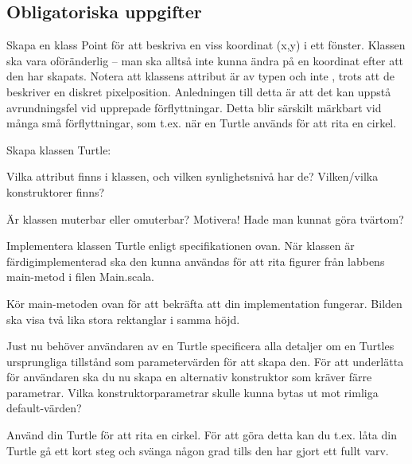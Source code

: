 \clearpage

\subsection{Obligatoriska uppgifter}

\Task Skapa en klass Point för att beskriva en viss koordinat (x,y) i ett fönster. Klassen ska vara oföränderlig -- man ska alltså inte kunna ändra på en koordinat efter att den har skapats. Notera att klassens attribut är av typen  och inte , trots att de beskriver en diskret pixelposition. Anledningen till detta är att det kan uppstå avrundningsfel vid upprepade förflyttningar. Detta blir särskilt märkbart vid många små förflyttningar, som t.ex. när en Turtle används för att rita en cirkel.



\Task Skapa klassen Turtle:

\vspace{1em} %


\Subtask Vilka attribut finns i klassen, och vilken synlighetsnivå har de? Vilken/vilka konstruktorer finns?

\Subtask Är klassen muterbar eller omuterbar? Motivera! Hade man kunnat göra tvärtom?

\Subtask Implementera klassen Turtle enligt specifikationen ovan. När klassen är färdigimplementerad ska den kunna användas för att rita figurer från labbens main-metod i filen Main.scala.


\Subtask Kör main-metoden ovan för att bekräfta att din implementation fungerar. Bilden ska visa två lika stora rektanglar i samma höjd.

\Subtask Just nu behöver användaren av en Turtle specificera alla detaljer om en Turtles ursprungliga tillstånd som parametervärden för att skapa den. För att underlätta för användaren ska du nu skapa en alternativ konstruktor som kräver färre parametrar. Vilka konstruktorparametrar skulle kunna bytas ut mot rimliga default-värden?

\Subtask Använd din Turtle för att rita en cirkel. För att göra detta kan du t.ex. låta din Turtle gå ett kort steg och svänga någon grad tills den har gjort ett fullt varv.

